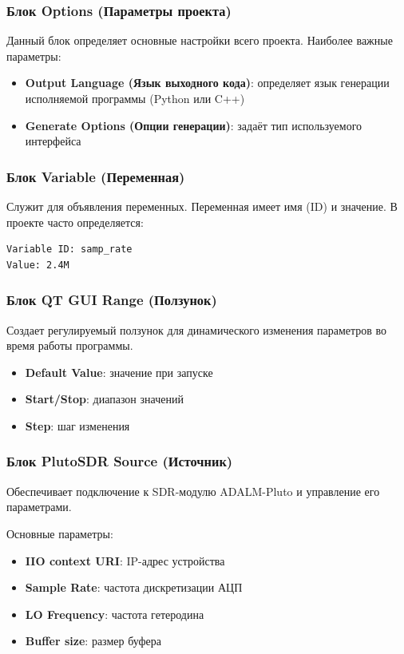 \subsubsection*{Блок Options (Параметры проекта)}
Данный блок определяет основные настройки всего проекта. Наиболее важные параметры:

\begin{itemize}
    \item \textbf{Output Language (Язык выходного кода)}: определяет язык генерации исполняемой программы (Python или C++)
    \item \textbf{Generate Options (Опции генерации)}: задаёт тип используемого интерфейса
\end{itemize}

\subsubsection*{Блок Variable (Переменная)}
Служит для объявления переменных. Переменная имеет имя (ID) и значение. В проекте часто определяется:

\begin{verbatim}
Variable ID: samp_rate
Value: 2.4M
\end{verbatim}

\subsubsection*{Блок QT GUI Range (Ползунок)}
Создает регулируемый ползунок для динамического изменения параметров во время работы программы.

\begin{itemize}
    \item \textbf{Default Value}: значение при запуске
    \item \textbf{Start/Stop}: диапазон значений
    \item \textbf{Step}: шаг изменения
\end{itemize}

\subsubsection*{Блок PlutoSDR Source (Источник)}
Обеспечивает подключение к SDR-модулю ADALM-Pluto и управление его параметрами.

Основные параметры:
\begin{itemize}
    \item \textbf{IIO context URI}: IP-адрес устройства
    \item \textbf{Sample Rate}: частота дискретизации АЦП
    \item \textbf{LO Frequency}: частота гетеродина
    \item \textbf{Buffer size}: размер буфера
\end{itemize}

